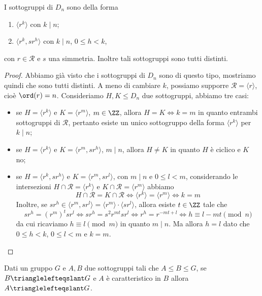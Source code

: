 \documentclass[11pt]{scrartcl}
\begin{document}
\begin{theorem}
I sottogruppi di $D_n$ sono della forma \begin{enumerate}[(1)]
    \item $\langle r^k\rangle$ con $k\mid n$;
    \item $\langle r^k, sr^h\rangle$ con $k \mid n$, $0\leq h < k$, 
\end{enumerate}
con $r \in \mathcal{R}$ e $s$ una simmetria. Inoltre tali sottogruppi sono
tutti distinti.
\end{theorem}

\begin{proof}
    Abbiamo già visto che i sottogruppi di $D_n$ sono di questo tipo, 
    mostriamo quindi che sono tutti distinti. A meno di cambiare $k$, possiamo
    supporre $\mathcal{R} = \langle r\rangle$, cioè $\ord(r) = n$. 
    Consideriamo $H, K\leqslant D_n$ due sottogruppi, abbiamo tre casi:
    \begin{itemize}
        \item se $H = \langle r^k\rangle$ e $K = \langle r^m\rangle$, $m \in \ZZ$,
        allora $H = K\iff k = m$ in quanto entrambi sottogruppi di $\mathcal{R}$, 
        pertanto esiste un unico sottogruppo della forma $\langle r^k\rangle$
        per $k \mid n$;
        \item se $H = \langle r^k\rangle$ e $K = \langle r^m, sr^h\rangle$, $m \mid n$,
        allora $H \neq K$ in quanto $H$ è ciclico e $K$ no;
        \item se $H = \langle r^k, sr^h\rangle$ e $K = \langle r^m, sr^l\rangle$, 
        con $m \mid n$ e $0\leq l < m$, considerando le intersezioni
        $H \cap \mathcal{R} = \langle r^k\rangle$ e $K \cap \mathcal{R} = \langle r^m\rangle$ 
        abbiamo \[
        H \cap \mathcal{R} = K\cap\mathcal{R} \iff \langle r^k\rangle = \langle r^m\rangle
        \iff k = m
        \] Inoltre, se $sr^h \in \langle r^m, sr^l\rangle = \langle r^m\rangle
        \cdot \langle sr^l\rangle$, allora esiste $t \in \ZZ$ tale che \[
        sr^h = (r^m)^t sr^l \iff sr^h = s^2r^{mt}sr^l \iff r^h = r^{-mt + l}
        \iff h \equiv l - mt \pmod n
        \]da cui ricaviamo $h \equiv l \pmod m$ in quanto $m \mid n$. Ma allora 
        $h =l$ dato che $0 \leq h < k$, $0\leq l < m$ e $k = m$.
    \end{itemize}
\end{proof}

\begin{lemma}
    \label{lemma1.20}
    Dati un gruppo $G$ e $A, B$ due sottogruppi tali che $A \leqslant B \leqslant G$,
    se $B\trianglelefteqslant G$ e $A$ è caratteristico in $B$ allora 
    $A \trianglelefteqslant G$.
\end{lemma}
\end{document}
